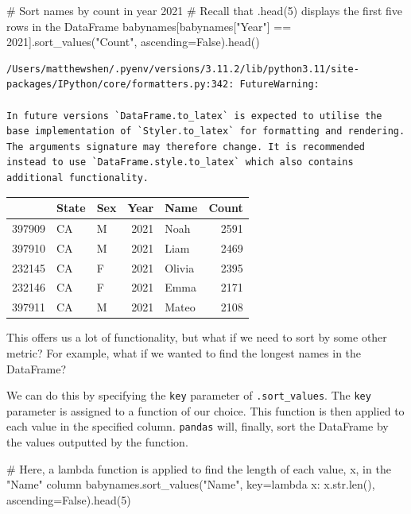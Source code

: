 \documentclass[
  letterpaper,
  DIV=11,
  numbers=noendperiod]{scrreprt}
\newenvironment{Shaded}{\begin{snugshade}}{\end{snugshade}}
\newcommand{\BuiltInTok}[1]{\textcolor[rgb]{0.00,0.23,0.31}{#1}}
\newcommand{\CommentTok}[1]{\textcolor[rgb]{0.37,0.37,0.37}{#1}}
\newcommand{\DecValTok}[1]{\textcolor[rgb]{0.68,0.00,0.00}{#1}}
\newcommand{\KeywordTok}[1]{\textcolor[rgb]{0.00,0.23,0.31}{#1}}
\newcommand{\NormalTok}[1]{\textcolor[rgb]{0.00,0.23,0.31}{#1}}
\newcommand{\OperatorTok}[1]{\textcolor[rgb]{0.37,0.37,0.37}{#1}}
\newcommand{\StringTok}[1]{\textcolor[rgb]{0.13,0.47,0.30}{#1}}
\newcommand{\VariableTok}[1]{\textcolor[rgb]{0.07,0.07,0.07}{#1}}
\begin{document}
\begin{Shaded}
\begin{Highlighting}[]
\CommentTok{\# Sort names by count in year 2021}
\CommentTok{\# Recall that \textasciigrave{}.head(5)\textasciigrave{} displays the first five rows in the DataFrame}
\NormalTok{babynames[babynames[}\StringTok{"Year"}\NormalTok{] }\OperatorTok{==} \DecValTok{2021}\NormalTok{].sort\_values(}\StringTok{"Count"}\NormalTok{, ascending}\OperatorTok{=}\VariableTok{False}\NormalTok{).head()}
\end{Highlighting}
\end{Shaded}

\begin{verbatim}
/Users/matthewshen/.pyenv/versions/3.11.2/lib/python3.11/site-packages/IPython/core/formatters.py:342: FutureWarning:

In future versions `DataFrame.to_latex` is expected to utilise the base implementation of `Styler.to_latex` for formatting and rendering. The arguments signature may therefore change. It is recommended instead to use `DataFrame.style.to_latex` which also contains additional functionality.
\end{verbatim}

\begin{tabular}{lllrlr}
\toprule
{} & State & Sex &  Year &    Name &  Count \\
\midrule
397909 &    CA &   M &  2021 &    Noah &   2591 \\
397910 &    CA &   M &  2021 &    Liam &   2469 \\
232145 &    CA &   F &  2021 &  Olivia &   2395 \\
232146 &    CA &   F &  2021 &    Emma &   2171 \\
397911 &    CA &   M &  2021 &   Mateo &   2108 \\
\bottomrule
\end{tabular}

This offers us a lot of functionality, but what if we need to sort by
some other metric? For example, what if we wanted to find the longest
names in the DataFrame?

We can do this by specifying the \texttt{key} parameter of
\texttt{.sort\_values}. The \texttt{key} parameter is assigned to a
function of our choice. This function is then applied to each value in
the specified column. \texttt{pandas} will, finally, sort the DataFrame
by the values outputted by the function.

\begin{Shaded}
\begin{Highlighting}[]
\CommentTok{\# Here, a lambda function is applied to find the length of each value, \textasciigrave{}x\textasciigrave{}, in the "Name" column}
\NormalTok{babynames.sort\_values(}\StringTok{"Name"}\NormalTok{, key}\OperatorTok{=}\KeywordTok{lambda}\NormalTok{ x: x.}\BuiltInTok{str}\NormalTok{.}\BuiltInTok{len}\NormalTok{(), ascending}\OperatorTok{=}\VariableTok{False}\NormalTok{).head(}\DecValTok{5}\NormalTok{)}
\end{Highlighting}
\end{Shaded}
\end{document}
